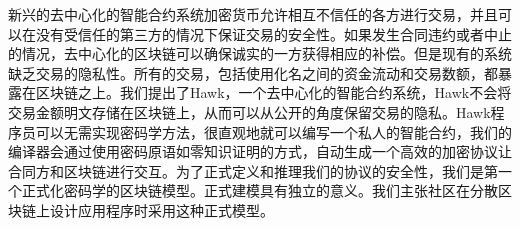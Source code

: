 新兴的去中心化的智能合约系统加密货币允许相互不信任的各方进行交易，并且可以在没有受信任的第三方的情况下保证交易的安全性。如果发生合同违约或者中止的情况，去中心化的区块链可以确保诚实的一方获得相应的补偿。但是现有的系统缺乏交易的隐私性。所有的交易，包括使用化名之间的资金流动和交易数额，都暴露在区块链之上。我们提出了Hawk，一个去中心化的智能合约系统，Hawk不会将交易金额明文存储在区块链上，从而可以从公开的角度保留交易的隐私。Hawk程序员可以无需实现密码学方法，很直观地就可以编写一个私人的智能合约，我们的编译器会通过使用密码原语如零知识证明的方式，自动生成一个高效的加密协议让合同方和区块链进行交互。为了正式定义和推理我们的协议的安全性，我们是第一个正式化密码学的区块链模型。正式建模具有独立的意义。我们主张社区在分散区块链上设计应用程序时采用这种正式模型。
